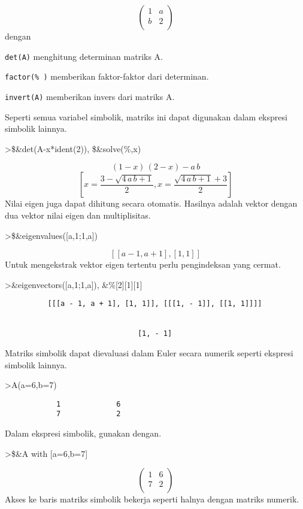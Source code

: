 \documentclass[
]{book}
\begin{document}
\[\begin{pmatrix}1 & a \\ b & 2 \\ \end{pmatrix}\]dengan

\texttt{det(A)} menghitung determinan matriks A.

\texttt{factor(\%\ )} memberikan faktor-faktor dari determinan.

\texttt{invert(A)} memberikan invers dari matriks A.

Seperti semua variabel simbolik, matriks ini dapat digunakan dalam ekspresi simbolik lainnya.

\textgreater\$\&det(A-x*ident(2)), \$\&solve(\%,x)

\[\left(1-x\right)\,\left(2-x\right)-a\,b\]\[\left[ x=\frac{3-\sqrt{4\,a\,b+1}}{2} , x=\frac{\sqrt{4\,a\,b+1}+3
 }{2} \right] \]Nilai eigen juga dapat dihitung secara otomatis. Hasilnya adalah vektor dengan dua vektor nilai eigen dan multiplisitas.

\textgreater\$\&eigenvalues({[}a,1;1,a{]})

\[\left[ \left[ a-1 , a+1 \right]  , \left[ 1 , 1 \right]  \right] \]Untuk mengekstrak vektor eigen tertentu perlu pengindeksan yang cermat.

\textgreater\&eigenvectors({[}a,1;1,a{]}), \&\%{[}2{]}{[}1{]}{[}1{]}

\begin{verbatim}
          [[[a - 1, a + 1], [1, 1]], [[[1, - 1]], [[1, 1]]]]


                               [1, - 1]
\end{verbatim}

Matriks simbolik dapat dievaluasi dalam Euler secara numerik seperti ekspresi simbolik lainnya.

\textgreater A(a=6,b=7)

\begin{verbatim}
            1             6 
            7             2 
\end{verbatim}

Dalam ekspresi simbolik, gunakan dengan.

\textgreater\$\&A with {[}a=6,b=7{]}

\[\begin{pmatrix}1 & 6 \\ 7 & 2 \\ \end{pmatrix}\]Akses ke baris matriks simbolik bekerja seperti halnya dengan matriks numerik.
\end{document}
